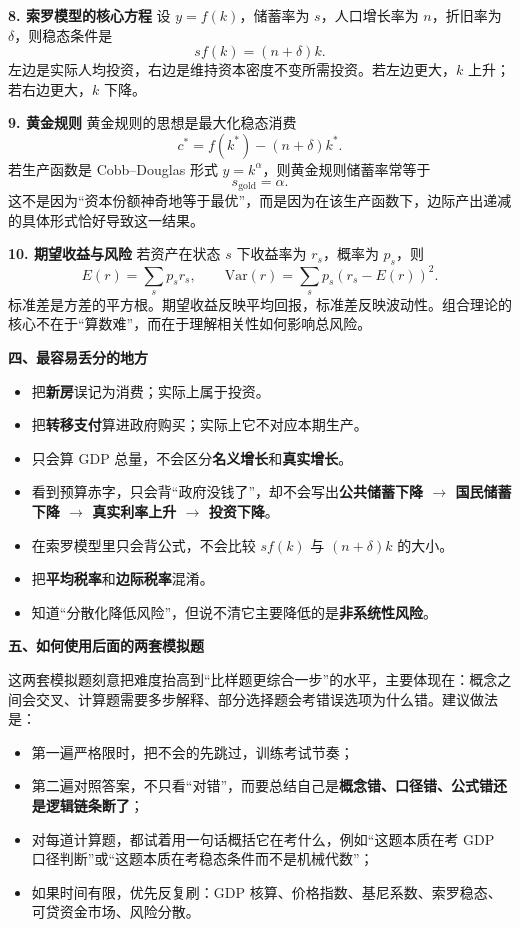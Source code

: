 \textbf{8. 索罗模型的核心方程}
设 $y=f(k)$，储蓄率为 $s$，人口增长率为 $n$，折旧率为 $\delta$，则稳态条件是
\[
sf(k)=(n+\delta)k.
\]
左边是实际人均投资，右边是维持资本密度不变所需投资。若左边更大，$k$ 上升；若右边更大，$k$ 下降。

\textbf{9. 黄金规则}
黄金规则的思想是最大化稳态消费
\[
c^*=f(k^*)-(n+\delta)k^*.
\]
若生产函数是 Cobb--Douglas 形式 $y=k^\alpha$，则黄金规则储蓄率常等于
\[
s_{\mathrm{gold}}=\alpha.
\]
这不是因为“资本份额神奇地等于最优”，而是因为在该生产函数下，边际产出递减的具体形式恰好导致这一结果。

\textbf{10. 期望收益与风险}
若资产在状态 $s$ 下收益率为 $r_s$，概率为 $p_s$，则
\[
E(r)=\sum_s p_s r_s,\qquad
\mathrm{Var}(r)=\sum_s p_s(r_s-E(r))^2.
\]
标准差是方差的平方根。期望收益反映平均回报，标准差反映波动性。组合理论的核心不在于“算数难”，而在于理解相关性如何影响总风险。

\textbf{四、最容易丢分的地方}

\begin{itemize}[leftmargin=2em,itemsep=0.25em,topsep=0.25em]
  \item 把\textbf{新房}误记为消费；实际上属于投资。
  \item 把\textbf{转移支付}算进政府购买；实际上它不对应本期生产。
  \item 只会算 GDP 总量，不会区分\textbf{名义增长}和\textbf{真实增长}。
  \item 看到预算赤字，只会背“政府没钱了”，却不会写出\textbf{公共储蓄下降 $\to$ 国民储蓄下降 $\to$ 真实利率上升 $\to$ 投资下降}。
  \item 在索罗模型里只会背公式，不会比较 $sf(k)$ 与 $(n+\delta)k$ 的大小。
  \item 把\textbf{平均税率}和\textbf{边际税率}混淆。
  \item 知道“分散化降低风险”，但说不清它主要降低的是\textbf{非系统性风险}。
\end{itemize}

\textbf{五、如何使用后面的两套模拟题}

这两套模拟题刻意把难度抬高到“比样题更综合一步”的水平，主要体现在：概念之间会交叉、计算题需要多步解释、部分选择题会考错误选项为什么错。建议做法是：

\begin{itemize}[leftmargin=2em,itemsep=0.25em,topsep=0.25em]
  \item 第一遍严格限时，把不会的先跳过，训练考试节奏；
  \item 第二遍对照答案，不只看“对错”，而要总结自己是\textbf{概念错、口径错、公式错还是逻辑链条断了}；
  \item 对每道计算题，都试着用一句话概括它在考什么，例如“这题本质在考 GDP 口径判断”或“这题本质在考稳态条件而不是机械代数”；
  \item 如果时间有限，优先反复刷：GDP 核算、价格指数、基尼系数、索罗稳态、可贷资金市场、风险分散。
\end{itemize}

